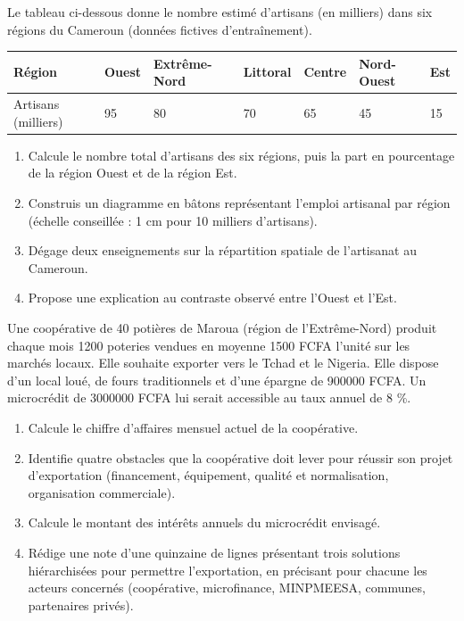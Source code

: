 \documentclass[11pt]{article}
\newcounter{popsec}
\newcounter{popsub}
\newcommand{\courssub}[1]{%
  \stepcounter{popsub}%
  \par\vspace{9pt}\noindent{\popxbold\fontsize{11.5}{13}\selectfont\color{popink}{\color{poporange}\thepopsec.\thepopsub}\hspace{6pt}#1}\par\nopagebreak\vspace{4pt}
}
\begin{document}
\courssub{Je me prépare au Bac}

\begin{exercice}
Le tableau ci-dessous donne le nombre estimé d'artisans (en milliers) dans six régions du Cameroun (données fictives d'entraînement).
\begin{center}
\begin{tabularx}{\linewidth}{|l|X|X|X|X|X|X|}\hline
\rowcolor{popblueL} Région & Ouest & Extrême-Nord & Littoral & Centre & Nord-Ouest & Est \\ \hline
Artisans (milliers) & 95 & 80 & 70 & 65 & 45 & 15 \\ \hline
\end{tabularx}
\end{center}
\begin{enumerate}
\item Calcule le nombre total d'artisans des six régions, puis la part en pourcentage de la région Ouest et de la région Est.
\item Construis un diagramme en bâtons représentant l'emploi artisanal par région (échelle conseillée : 1 cm pour 10 milliers d'artisans).
\item Dégage deux enseignements sur la répartition spatiale de l'artisanat au Cameroun.
\item Propose une explication au contraste observé entre l'Ouest et l'Est.
\end{enumerate}
\end{exercice}

\begin{exercice}
Une coopérative de 40 potières de Maroua (région de l'Extrême-Nord) produit chaque mois \num{1200} poteries vendues en moyenne \num{1500} FCFA l'unité sur les marchés locaux. Elle souhaite exporter vers le Tchad et le Nigeria. Elle dispose d'un local loué, de fours traditionnels et d'une épargne de \num{900000} FCFA. Un microcrédit de \num{3000000} FCFA lui serait accessible au taux annuel de 8 \%.
\begin{enumerate}
\item Calcule le chiffre d'affaires mensuel actuel de la coopérative.
\item Identifie quatre obstacles que la coopérative doit lever pour réussir son projet d'exportation (financement, équipement, qualité et normalisation, organisation commerciale).
\item Calcule le montant des intérêts annuels du microcrédit envisagé.
\item Rédige une note d'une quinzaine de lignes présentant trois solutions hiérarchisées pour permettre l'exportation, en précisant pour chacune les acteurs concernés (coopérative, microfinance, MINPMEESA, communes, partenaires privés).
\end{enumerate}
\end{exercice}
\end{document}
